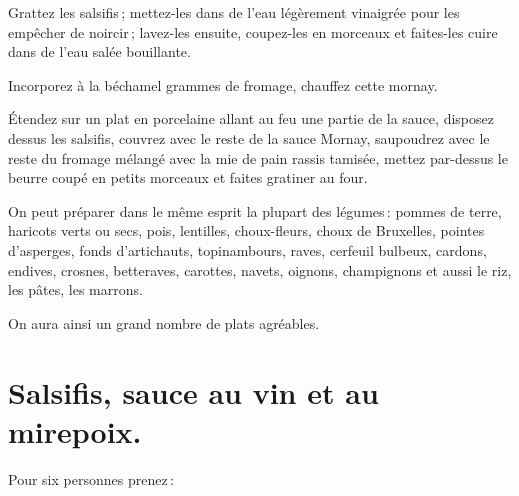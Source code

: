Grattez les salsifis ; mettez-les dans de l'eau légèrement vinaigrée pour les
empêcher de noircir ; lavez-les ensuite, coupez-les en morceaux et faites-les
cuire dans de l'eau salée bouillante.

Incorporez à la béchamel {\mmm} grammes de fromage, chauffez cette
mornay.

Étendez sur un plat en porcelaine allant au feu une partie de la sauce,
disposez dessus les salsifis, couvrez avec le reste de la sauce Mornay,
saupoudrez avec le reste du fromage mélangé avec la mie de pain rassis tamisée,
mettez par-dessus le beurre coupé en petits morceaux et faites gratiner au
four.

\sk

On peut préparer dans le même esprit la plupart des légumes : pommes de terre,
haricots verts ou secs, pois, lentilles, choux-fleurs, choux de Bruxelles,
pointes d'asperges, fonds d'artichauts, topinambours, raves, cerfeuil bulbeux,
cardons, endives, crosnes, betteraves, carottes, navets, oignons, champignons
et aussi le riz, les pâtes, les marrons.

On aura ainsi un grand nombre de plats agréables.

\section*{\centering Salsifis, sauce au vin et au mirepoix.}
{}

Pour six personnes prenez :

